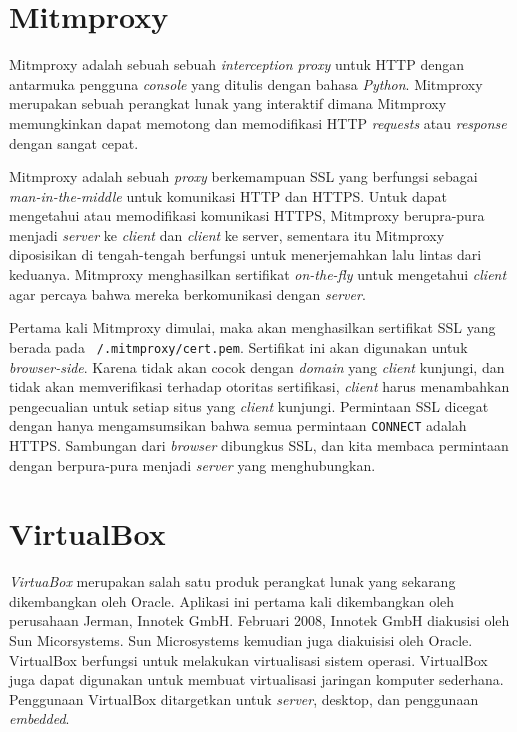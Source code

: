 \section{Mitmproxy}

Mitmproxy adalah sebuah sebuah \textit{interception proxy} untuk HTTP dengan antarmuka pengguna \textit{console} yang ditulis dengan bahasa \textit{Python}. Mitmproxy merupakan sebuah perangkat lunak yang interaktif dimana Mitmproxy memungkinkan dapat memotong dan memodifikasi HTTP \textit{requests} atau \textit{response} dengan sangat cepat.

Mitmproxy adalah sebuah \textit{proxy} berkemampuan SSL yang berfungsi sebagai \textit{man-in-the-middle} untuk komunikasi HTTP dan HTTPS. Untuk dapat mengetahui atau memodifikasi komunikasi HTTPS, Mitmproxy berupra-pura menjadi \textit{server} ke \textit{client} dan \textit{client} ke server, sementara itu Mitmproxy diposisikan di tengah-tengah berfungsi untuk menerjemahkan lalu lintas dari keduanya. Mitmproxy menghasilkan sertifikat \textit{on-the-fly} untuk mengetahui \textit{client} agar percaya bahwa mereka berkomunikasi dengan \textit{server}. \cite{bab2-mitmproxy}

Pertama kali Mitmproxy dimulai, maka akan menghasilkan sertifikat SSL yang berada pada \texttt{~/.mitmproxy/cert.pem}. Sertifikat ini akan digunakan untuk \textit{browser-side}. Karena tidak akan cocok dengan \textit{domain} yang \textit{client} kunjungi, dan tidak akan memverifikasi terhadap otoritas sertifikasi, \textit{client} harus menambahkan pengecualian untuk setiap situs yang \textit{client} kunjungi. Permintaan SSL dicegat dengan hanya mengamsumsikan bahwa semua permintaan \texttt{CONNECT} adalah HTTPS. Sambungan dari \textit{browser} dibungkus SSL, dan kita membaca permintaan dengan berpura-pura menjadi \textit{server} yang menghubungkan.

\section{VirtualBox}
\textit{VirtuaBox} merupakan salah satu produk perangkat lunak yang sekarang dikembangkan oleh Oracle. Aplikasi ini pertama kali dikembangkan oleh perusahaan Jerman, Innotek GmbH. Februari 2008, Innotek GmbH diakusisi oleh Sun Micorsystems. Sun Microsystems kemudian juga diakuisisi oleh Oracle. VirtualBox berfungsi untuk melakukan virtualisasi sistem operasi. VirtualBox juga dapat digunakan untuk membuat virtualisasi jaringan komputer sederhana. Penggunaan VirtualBox ditargetkan untuk \textit{server}, desktop, dan penggunaan \textit{embedded}.

